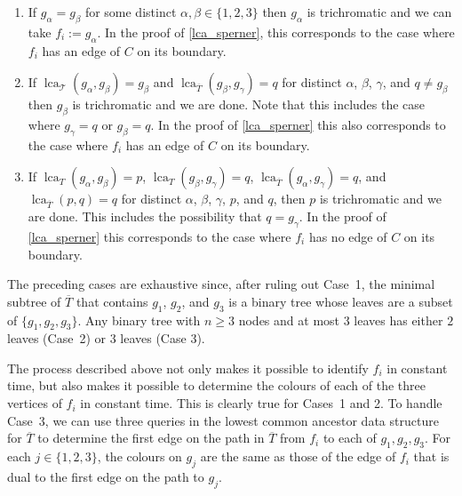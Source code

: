 \documentclass{patmorin}
\DeclareMathOperator{\lca}{lca}
\begin{document}
\begin{enumerate}
  \item If $g_\alpha=g_\beta$ for some distinct $\alpha,\beta\in\{1,2,3\}$  then $g_\alpha$ is trichromatic and we can take $f_i:=g_\alpha$.  In the proof of \cref{lca_sperner}, this corresponds to the case where $f_i$ has an edge of $C$ on its boundary.


  \item If $\lca_{\mathcal{T}}(g_\alpha,g_\beta)=g_\beta$ and $\lca_{\overline{T}}(g_\beta,g_\gamma)=q$ for distinct  $\alpha$, $\beta$, $\gamma$, and $q\ne g_\beta$ then $g_\beta$ is trichromatic and we are done.  Note that this includes the case where $g_\gamma=q$ or $g_\beta=q$.  In the proof of \cref{lca_sperner} this also corresponds to the case where $f_i$ has an edge of $C$ on its boundary.

  \item If $\lca_{T}(g_\alpha,g_\beta)=p$, $\lca_{T}(g_\beta,g_\gamma)=q$,  $\lca_{\overline{T}}(g_\alpha,g_\gamma)=q$, and $\lca_{\overline{T}}(p,q)=q$ for distinct $\alpha$, $\beta$, $\gamma$, $p$, and $q$, then $p$ is trichromatic and we are done. This includes the possibility that  $q=g_\gamma$.  In the proof of \cref{lca_sperner} this corresponds to the case where $f_i$ has no edge of $C$ on its boundary.
\end{enumerate}
The preceding cases are exhaustive since, after ruling out Case~1, the minimal subtree of $\overline{T}$ that contains $g_1$, $g_2$, and $g_3$ is a binary tree whose leaves are a subset of $\{g_1,g_2,g_3\}$.  Any binary tree with $n\ge 3$ nodes and at most $3$ leaves has either $2$ leaves (Case~2) or $3$ leaves (Case 3).

\begin{rem}\label{colour_remark}
  The process described above not only makes it possible to identify $f_i$ in constant time, but also makes it possible to determine the colours of each of the three vertices of $f_i$ in constant time.  This is clearly true for Cases~1 and 2. To handle Case~3, we can use three queries in the lowest common ancestor data structure for $\overline{T}$ to determine the first edge on the path in $\overline{T}$ from $f_i$ to each of $g_1,g_2,g_3$.  For each $j\in\{1,2,3\}$, the colours on $g_j$ are the same as those of the edge of $f_i$ that is dual to the first edge on the path to $g_j$.
\end{rem}
\end{document}
